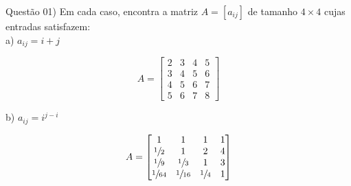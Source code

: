 
\noindent \textcolor{COLOR1}{Questão 01)} Em cada caso, encontra a matriz $A = [a_{ij}]$ de tamanho $4 \times 4$ cujas entradas
satisfazem:
\\

a) $a_{ij} = i + j$

\begin{equation}
    A =
    \begin{bmatrix}
        2 & 3 & 4 & 5 \\
        3 & 4 & 5 & 6 \\
        4 & 5 & 6 & 7 \\
        5 & 6 & 7 & 8
    \end{bmatrix}
\end{equation}

b) $a_{ij} = i^{j-i}$

\begin{equation}
    A =
    \begin{bmatrix}
        1             & 1             & 1            & 1 \\
        \sfrac{1}{2}  & 1             & 2            & 4 \\
        \sfrac{1}{9}  & \sfrac{1}{3}  & 1            & 3 \\
        \sfrac{1}{64} & \sfrac{1}{16} & \sfrac{1}{4} & 1
    \end{bmatrix}
\end{equation}